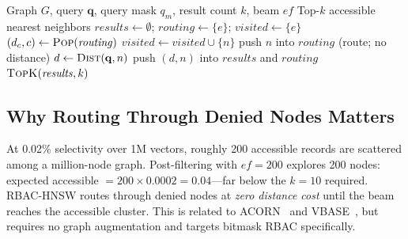 \begin{algorithm}[t]
\small
\caption{RBAC-HNSW Greedy Search (Layer 0)}
\label{alg:rbac_search}
\begin{algorithmic}[1]
\Require Graph $G$, query $\mathbf{q}$, query mask $q_m$, result count $k$, beam $\mathit{ef}$
\Ensure Top-$k$ accessible nearest neighbors
\State $\mathit{results} \leftarrow \emptyset$; $\mathit{routing} \leftarrow \{e\}$; $\mathit{visited} \leftarrow \{e\}$
    \State $(d_c, c) \leftarrow \textsc{Pop}(\mathit{routing})$
        \State $\mathit{visited} \leftarrow \mathit{visited} \cup \{n\}$
         \label{alg:gate1} 
            \State push $n$ into $\mathit{routing}$ (route; no distance) \label{alg:route}
        \Else
            \State $d \leftarrow \textsc{Dist}(\mathbf{q}, n)$ \label{alg:gate2} 
            \State push $(d, n)$ into $\mathit{results}$ and $\mathit{routing}$
        \EndIf
    \EndFor
\EndWhile
\State \Return $\textsc{TopK}(\mathit{results}, k)$
\end{algorithmic}
\end{algorithm}

\subsection{Why Routing Through Denied Nodes Matters}
\label{sec:routing}

At 0.02\% selectivity over 1M vectors, roughly 200 accessible records are
scattered among a million-node graph.
Post-filtering with $\mathit{ef}\!=\!200$ explores 200 nodes: expected accessible
$=200\!\times\!0.0002\!=\!0.04$---far below the $k\!=\!10$ required.
RBAC-HNSW routes through denied nodes at \emph{zero distance cost} until
the beam reaches the accessible cluster.
This is related to ACORN~\cite{patel2024acorn} and VBASE~\cite{zhang2023vbase},
but requires no graph augmentation and targets bitmask RBAC specifically.
